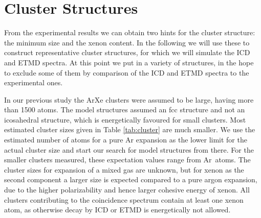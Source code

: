 \section{Cluster Structures}

From the experimental results we can obtain two hints for the cluster
structure: the minimum size and the xenon content. In the following we will 
use these to construct representative cluster structures, for which we will 
simulate the ICD and ETMD spectra. At this point we put in a variety of structures,
in the hope to exclude some of them by comparison of
the ICD and ETMD spectra to the experimental ones.

In our previous study\cite{Fasshauer13} the ArXe clusters were assumed
to be large, having more than 1500 atoms. The model structures assumed
an fcc structure and not an icosahedral structure, which is energetically
favoured for small clusters.
Most estimated cluster sizes given in Table \ref{tab:cluster} are much smaller.
We use the estimated number of atoms for a pure Ar expansion as the lower limit for the actual cluster size and start our search for model structures from there.
%
%
For the smaller clusters measured,
these expectation values range from \unit[3--21]{Ar atoms}. 
The cluster sizes for expansion of a mixed gas are unknown, but
for xenon as the second component a larger size is expected compared to a
pure argon expansion, due to the higher polarizability
and hence larger cohesive energy of xenon. All clusters
contributing to the coincidence spectrum
contain at least one xenon atom, as otherwise decay by ICD or ETMD is energetically not allowed.

